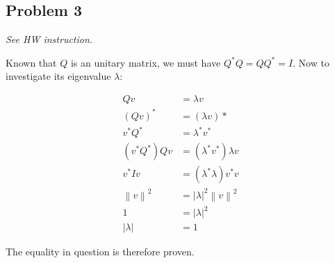 \documentclass[11pt]{article}
\providecommand{\norm}[1]{\left\lVert #1 \right\rVert}
\providecommand{\len}[1]{\left| #1 \right|}
\begin{document}
\subsection*{Problem 3}
\textit{See HW instruction.}\newline

Known that $Q$ is an unitary matrix, we must have $Q^* Q = QQ^* = I$. Now to investigate its eigenvalue $\lambda$:

\begin{align*}
    Qv &= \lambda v \\
    (Qv)^* &= (\lambda v)* \\
    v^* Q^* &=  \lambda^* v^*\\
    (v^* Q^*) Qv &= (\lambda^* v^*)  \lambda v \\
    v^* I v &= (\lambda^* \lambda) v^* v \\
    \norm{v}^2 &= \len{\lambda}^2 \norm{v}^2 \\
    1 &= \len{\lambda}^2 \\
    \len{\lambda} &= 1
\end{align*}

The equality in question is therefore proven.
\end{document}
